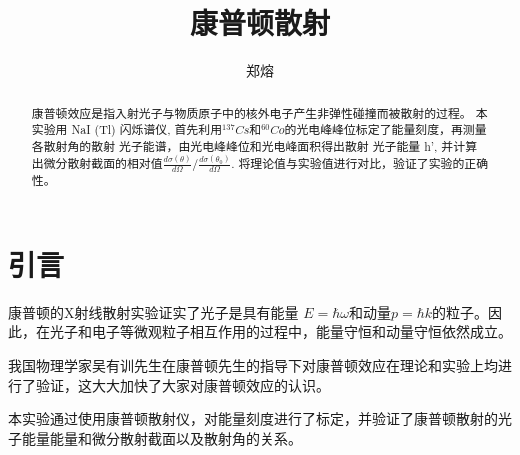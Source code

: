 \documentclass[font=default]{mpltx}
\makeatletter
\newcommand{\note}[1]{{\color{gray}#1}}
\newcommand*\file[1]{\textbf{\texttt{#1}}}
\newcommand\releasedate{%
    \href{https://github.com/CastleStar14654/PKUMpLtX/releases/tag/\mpltx@fileversion}%
        {\mpltx@filedate, \mpltx@fileversion}}
\makeatother
\begin{document}
\title{康普顿散射} %
\author{郑熔} %
\date{}
\begin{abstract}
  康普顿效应是指入射光子与物质原子中的核外电子产生非弹性碰撞而被散射的过程。
  本实验用 NaI (Tl) 闪烁谱仪, 首先利用$^{137}Cs$和$^{60}Co$的光电峰峰位标定了能量刻度，再测量各散射角的散射 \gamma 光子能谱，由光电峰峰位和光电峰面积得出散射 \gamma 光子能量 h\nu', 并计算出微分散射截面的相对值$\frac{d\sigma(\theta)}{d\Omega}/\frac{d\sigma(\theta_0)}{d\Omega}$.
  将理论值与实验值进行对比，验证了实验的正确性。
\end{abstract}

\maketitle

\section{引言}
康普顿的X射线散射实验证实了光子是具有能量 $E = \hbar \omega$和动量$p=\hbar k$的粒子。因此，在光子和电子等微观粒子相互作用的过程中，能量守恒和动量守恒依然成立。

我国物理学家吴有训先生在康普顿先生的指导下对康普顿效应在理论和实验上均进行了验证，这大大加快了大家对康普顿效应的认识。

本实验通过使用康普顿散射仪，对能量刻度进行了标定，并验证了康普顿散射的\gamma 光子能量能量和微分散射截面以及散射角的关系。
\end{document}

